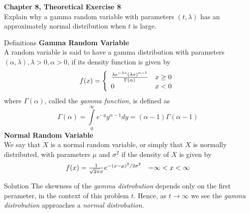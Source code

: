 \documentclass{article}
\begin{document}
\begin{spacing}{1.1}
\newpage
\begin{homeworkProblem}
  {\bf Chapter 8, Theoretical Exercise 8}\\
  Explain why a gamma random variable with parameters $(t, \lambda)$ has 
  an approximately normal distribution when $t$ is large.
  \begin{homeworkSection}{Definitions}
    {\bf Gamma Random Variable}\\
    A random variable is said to have a gamma distribution with parameters 
    $(\alpha, \lambda), \lambda > 0, \alpha > 0$, if its density function 
    is given by
      \[f(x) = 
        \left\{ \begin{array}{l l}
          \frac{ \lambda e^{-\lambda x}(\lambda x)^{\alpha - 1}}{ \Gamma( \alpha)} & x \ge 0\\
          0 & x < 0
        \end{array}\right.
      \]
    where $\Gamma( \alpha)$, called the \emph{gamma function}, is defined as
      \[\Gamma( \alpha) 
        = \int\limits_0^\infty e^{-y} y^{\alpha - 1} dy 
        = (\alpha - 1)\Gamma( \alpha -1)\]
    {\bf Normal Random Variable}\\
    We say that $X$ is a normal random variable, or simply that $X$ is normally 
    distributed, with parameters $\mu$ and $\sigma^2$ if the density of $X$ is given by
      \[\begin{array}{l l} f( x) = \frac{ 1}{ \sqrt{ 2 \pi} \sigma} e^{-(x - \mu)^2/ 2 \sigma^2} & -\infty < x < \infty \end{array}\]
  \end{homeworkSection}
  \begin{homeworkSection}{Solution}
    The skewness of the \emph{gamma distrobution} depends only on the 
    first perameter, in the context of this problem $t$.  Hence, as 
    $t \rightarrow \infty$ we see the \emph{gamma distrobution} approaches 
    a \emph{normal distrobution}.
    
  \end{homeworkSection}
\end{homeworkProblem}


\end{spacing}
\end{document}
